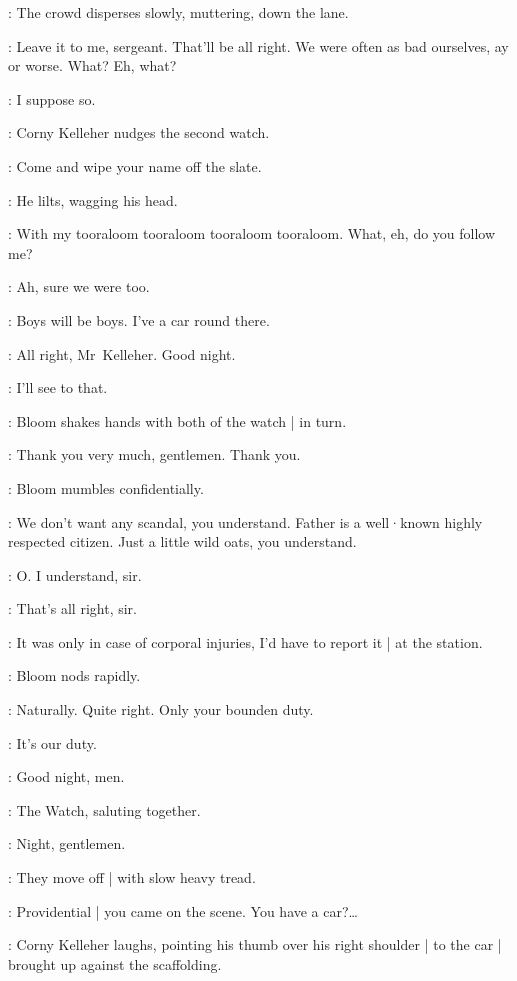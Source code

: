 :
The crowd disperses slowly,
muttering,
down the lane.

\Corny:
Leave it to me,
sergeant.
That'll be all right.
We were often as bad ourselves,
ay or worse.
What? Eh,
what?

\FirstWatch:
I suppose so.

:
Corny Kelleher nudges the second watch.

\Corny:
Come and wipe your name off the slate.

:
He lilts,
wagging his head.

\Corny:
With my tooraloom tooraloom tooraloom tooraloom.
What,
eh,
do you follow me?

\SecondWatch:
Ah,
sure we were too.

\Corny:
Boys will be boys.
I've a car round there.

\SecondWatch:
All right,
Mr~Kelleher.
Good night.

\Corny:
I'll see to that.

:
Bloom shakes hands with both of the watch |
in turn.

\Bloom:
Thank you very much,
gentlemen.
Thank you.

:
Bloom mumbles confidentially.

\Bloom:
We don't want any scandal,
you understand.
%
Father is a well·known highly respected citizen.
Just a little wild oats,
you understand.

\FirstWatch:
O. I understand,
sir.

\SecondWatch:
That's all right,
sir.

\FirstWatch:
It was only in case of corporal injuries,
I'd have to report it |
at the station.

:
Bloom nods rapidly.

\Bloom:
Naturally.
Quite right.
Only your bounden duty.

\SecondWatch:
It's our duty.

\Corny:
Good night,
men.

:
The Watch,
saluting together.

\Watch:
Night,
gentlemen.

:
They move off |
with slow heavy tread.

\Bloom:
Providential |
you came on the scene.
You have a car?…

:
Corny Kelleher laughs,
pointing his thumb over his right shoulder |
%
to the car |
brought up against the scaffolding.

